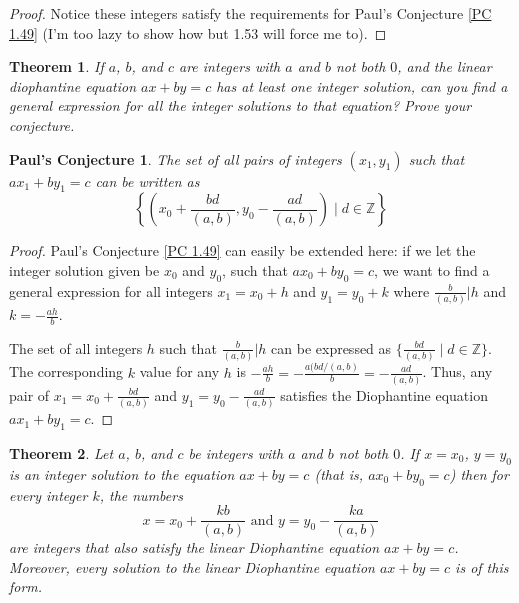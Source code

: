\documentclass{article}
\newtheorem{thm}{Theorem}[section]
\newtheorem{PC}{Paul's Conjecture}
\numberwithin{equation}{thm}
\begin{document}
\begin{proof}
  Notice these integers satisfy the requirements for Paul's Conjecture \ref{PC 1.49} (I'm too lazy to show how but 1.53 will force me to).
\end{proof}



\begin{thm} \label{1.52}
  If $a$, $b$, and $c$ are integers with $a$ and $b$ not both $0$, and the linear diophantine equation $ax + by = c$ has at least one integer solution, can you find a general expression for all the integer solutions to that equation? Prove your conjecture.
\end{thm}

\begin{PC} \label{PC 1.52}
  The set of all pairs of integers $(x_1, y_1)$ such that $ax_1 + by_1 = c$ can be written as $$\left\{ \left(x_0 + \frac{bd}{(a,b)}, y_0 - \frac{ad}{(a,b)} \right) \mid d \in \mathbb{Z} \right\}$$
\end{PC}

\begin{proof}
Paul's Conjecture \ref{PC 1.49} can easily be extended here: if we let the integer solution given be $x_0$ and $y_0$, such that $ax_0 + by_0 = c$, we want to find a general expression for all integers $x_1 = x_0 + h$ and $y_1 = y_0 + k$ where $\frac{b}{(a,b)} | h$ and $k = - \frac{ah}{b}$.

The set of all integers $h$ such that $\frac{b}{(a,b)} | h$ can be expressed as $\{\frac{bd}{(a,b)} \mid d \in \mathbb{Z}\}$. The corresponding $k$ value for any $h$ is $- \frac{ah}{b} = - \frac{a (bd / (a,b)}{b} = - \frac{ad}{(a,b)}$.
Thus, any pair of $x_1 = x_0 + \frac{bd}{(a, b)}$ and $y_1 = y_0 - \frac{ad}{(a,b)}$ satisfies the Diophantine equation $ax_1 + by_1 = c$.
\end{proof}



\begin{thm} \label{1.53}
  Let $a$, $b$, and $c$ be integers with $a$ and $b$ not both $0$. If $x = x_0$, $y = y_0$ is an integer solution to the equation $ax + by = c$ (that is, $ax_0 + by_0 = c$) then for every integer $k$, the numbers
  $$x = x_0 + \frac{kb}{(a,b)} \mbox{ and } y = y_0 - \frac{ka}{(a,b)}$$
  are integers that also satisfy the linear Diophantine equation $ax + by = c$. Moreover, every solution to the linear Diophantine equation $ax + by = c$ is of this form.
\end{thm}
\end{document}
